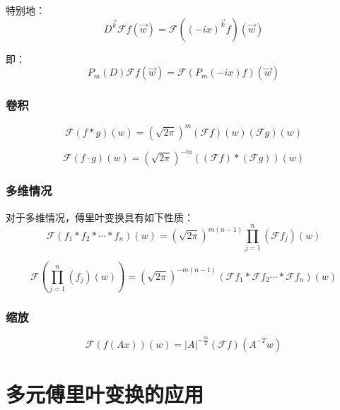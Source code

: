 \documentclass[12pt,a4paper]{article}
\numberwithin{subsection}{section}   %
\numberwithin{subsubsection}{subsection}
\theoremstyle{plain}
\theoremstyle{definition}
\theoremstyle{remark}
\theoremstyle{remark}
\begin{document}
特别地：
\begin{equation}
	D^{\vec{k}} \mathcal{F}f(\vec{w}) = \mathcal{F}((-i x)^{\vec{k}} f)(\vec{w})
\end{equation}

即：
\begin{equation}
	P_m(D) \mathcal{F}f(\vec{w}) = \mathcal{F}(P_m(-i x) f)(\vec{w})
\end{equation}

\subsubsection{卷积}
\begin{equation}
	\mathcal{F}(f * g)(w) = (\sqrt{2\pi})^m (\mathcal{F}f)(w) (\mathcal{F}g)(w)
\end{equation}

\begin{equation}
	\mathcal{F}(f \cdot g)(w) = (\sqrt{2\pi})^{-m} \left( (\mathcal{F}f) * (\mathcal{F}g) \right)(w)
\end{equation}

\subsubsection{多维情况}
对于多维情况，傅里叶变换具有如下性质：
\begin{equation}
	\mathcal{F}\left( f_1 * f_2 * \cdots * f_n \right)(w) = (\sqrt{2\pi})^{m(n-1)} \prod_{j=1}^n (\mathcal{F}f_j)(w)
\end{equation}

\begin{equation}
	\mathcal{F}(\prod_{j=1}^n (f_j)(w)) = (\sqrt{2\pi})^{-m(n-1)} (\mathcal{F}f_1*\mathcal{F}f_2\cdots * \mathcal{F}f_n)(w)
\end{equation}

\subsubsection{缩放}
\begin{equation}
	\mathcal{F}(f(Ax))(w) = |A|^{-\frac{m}{2}} (\mathcal{F}f)(A^{-T} w)
\end{equation}


\section{多元傅里叶变换的应用}
\end{document}
